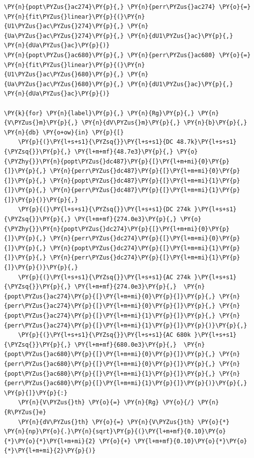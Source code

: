 \begin{tcolorbox}[breakable, size=fbox, boxrule=1pt, pad at break*=1mm,colback=cellbackground, colframe=cellborder]
\begin{Verbatim}[commandchars=\\\{\}]
\PY{n}{popt\PYZus{}ac274}\PY{p}{,} \PY{n}{perr\PYZus{}ac274} \PY{o}{=} \PY{n}{fit\PYZus{}linear}\PY{p}{(}\PY{n}{U1\PYZus{}ac\PYZus{}274}\PY{p}{,} \PY{n}{Ua\PYZus{}ac\PYZus{}274}\PY{p}{,} \PY{n}{dU1\PYZus{}ac}\PY{p}{,} \PY{n}{dUa\PYZus{}ac}\PY{p}{)}
\PY{n}{popt\PYZus{}ac680}\PY{p}{,} \PY{n}{perr\PYZus{}ac680} \PY{o}{=} \PY{n}{fit\PYZus{}linear}\PY{p}{(}\PY{n}{U1\PYZus{}ac\PYZus{}680}\PY{p}{,} \PY{n}{Ua\PYZus{}ac\PYZus{}680}\PY{p}{,} \PY{n}{dU1\PYZus{}ac}\PY{p}{,} \PY{n}{dUa\PYZus{}ac}\PY{p}{)}

\PY{k}{for} \PY{n}{label}\PY{p}{,} \PY{n}{Rg}\PY{p}{,} \PY{n}{V\PYZus{}m}\PY{p}{,} \PY{n}{dV\PYZus{}m}\PY{p}{,} \PY{n}{b}\PY{p}{,} \PY{n}{db} \PY{o+ow}{in} \PY{p}{[}
    \PY{p}{(}\PY{l+s+s1}{\PYZsq{}}\PY{l+s+s1}{DC 48.7k}\PY{l+s+s1}{\PYZsq{}}\PY{p}{,} \PY{l+m+mf}{48.7e3}\PY{p}{,} \PY{o}{\PYZhy{}}\PY{n}{popt\PYZus{}dc487}\PY{p}{[}\PY{l+m+mi}{0}\PY{p}{]}\PY{p}{,} \PY{n}{perr\PYZus{}dc487}\PY{p}{[}\PY{l+m+mi}{0}\PY{p}{]}\PY{p}{,} \PY{n}{popt\PYZus{}dc487}\PY{p}{[}\PY{l+m+mi}{1}\PY{p}{]}\PY{p}{,} \PY{n}{perr\PYZus{}dc487}\PY{p}{[}\PY{l+m+mi}{1}\PY{p}{]}\PY{p}{)}\PY{p}{,}
    \PY{p}{(}\PY{l+s+s1}{\PYZsq{}}\PY{l+s+s1}{DC 274k }\PY{l+s+s1}{\PYZsq{}}\PY{p}{,} \PY{l+m+mf}{274.0e3}\PY{p}{,} \PY{o}{\PYZhy{}}\PY{n}{popt\PYZus{}dc274}\PY{p}{[}\PY{l+m+mi}{0}\PY{p}{]}\PY{p}{,} \PY{n}{perr\PYZus{}dc274}\PY{p}{[}\PY{l+m+mi}{0}\PY{p}{]}\PY{p}{,} \PY{n}{popt\PYZus{}dc274}\PY{p}{[}\PY{l+m+mi}{1}\PY{p}{]}\PY{p}{,} \PY{n}{perr\PYZus{}dc274}\PY{p}{[}\PY{l+m+mi}{1}\PY{p}{]}\PY{p}{)}\PY{p}{,}
    \PY{p}{(}\PY{l+s+s1}{\PYZsq{}}\PY{l+s+s1}{AC 274k }\PY{l+s+s1}{\PYZsq{}}\PY{p}{,} \PY{l+m+mf}{274.0e3}\PY{p}{,}  \PY{n}{popt\PYZus{}ac274}\PY{p}{[}\PY{l+m+mi}{0}\PY{p}{]}\PY{p}{,} \PY{n}{perr\PYZus{}ac274}\PY{p}{[}\PY{l+m+mi}{0}\PY{p}{]}\PY{p}{,} \PY{n}{popt\PYZus{}ac274}\PY{p}{[}\PY{l+m+mi}{1}\PY{p}{]}\PY{p}{,} \PY{n}{perr\PYZus{}ac274}\PY{p}{[}\PY{l+m+mi}{1}\PY{p}{]}\PY{p}{)}\PY{p}{,}
    \PY{p}{(}\PY{l+s+s1}{\PYZsq{}}\PY{l+s+s1}{AC 680k }\PY{l+s+s1}{\PYZsq{}}\PY{p}{,} \PY{l+m+mf}{680.0e3}\PY{p}{,}  \PY{n}{popt\PYZus{}ac680}\PY{p}{[}\PY{l+m+mi}{0}\PY{p}{]}\PY{p}{,} \PY{n}{perr\PYZus{}ac680}\PY{p}{[}\PY{l+m+mi}{0}\PY{p}{]}\PY{p}{,} \PY{n}{popt\PYZus{}ac680}\PY{p}{[}\PY{l+m+mi}{1}\PY{p}{]}\PY{p}{,} \PY{n}{perr\PYZus{}ac680}\PY{p}{[}\PY{l+m+mi}{1}\PY{p}{]}\PY{p}{)}\PY{p}{,}
\PY{p}{]}\PY{p}{:}
    \PY{n}{V\PYZus{}th} \PY{o}{=} \PY{n}{Rg} \PY{o}{/} \PY{n}{R\PYZus{}e}
    \PY{n}{dV\PYZus{}th} \PY{o}{=} \PY{n}{V\PYZus{}th} \PY{o}{*} \PY{n}{np}\PY{o}{.}\PY{n}{sqrt}\PY{p}{(}\PY{l+m+mf}{0.10}\PY{o}{*}\PY{o}{*}\PY{l+m+mi}{2} \PY{o}{+} \PY{l+m+mf}{0.10}\PY{o}{*}\PY{o}{*}\PY{l+m+mi}{2}\PY{p}{)}

\end{Verbatim}
\end{tcolorbox}
